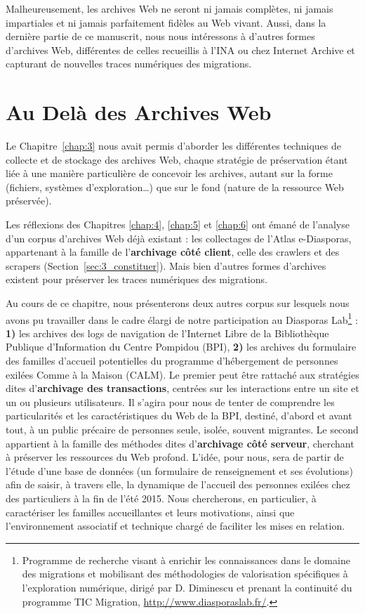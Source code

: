 \documentclass[symmetric,justified,marginals=raggedouter]{tufte-book}
\begin{document}
Malheureusement, les archives Web ne seront ni jamais complètes, ni jamais impartiales et ni jamais parfaitement fidèles au Web vivant. Aussi, dans la dernière partie de ce manuscrit, nous nous intéressons à d'autres formes d'archives Web, différentes de celles recueillis à l'INA ou chez Internet Archive et capturant de nouvelles traces numériques des migrations.



\chapter{Au Delà des Archives Web}
\label{chap:7}

\noindent Le Chapitre~\ref{chap:3} nous avait permis d'aborder les différentes techniques de collecte et de stockage des archives Web, chaque stratégie de préservation étant liée à une manière particulière de concevoir les archives, autant sur la forme (fichiers, systèmes d'exploration\ldots{}) que sur le fond (nature de la ressource Web préservée).

Les réflexions des Chapitres \ref{chap:4}, \ref{chap:5} et \ref{chap:6} ont émané de l'analyse d'un corpus d'archives Web déjà existant : les collectages de l'Atlas e-Diasporas, appartenant à la famille de l'\textbf{archivage côté client}, celle des crawlers et des scrapers (Section~\ref{sec:3_constituer}). Mais bien d'autres formes d'archives existent pour préserver les traces numériques des migrations. 

Au cours de ce chapitre, nous présenterons deux autres corpus sur lesquels nous avons pu travailler dans le cadre élargi de notre participation au Diasporas Lab\footnote{\RaggedOuter Programme de recherche visant à enrichir les connaissances dans le domaine des migrations et mobilisant des méthodologies de valorisation spécifiques à l'exploration numérique, dirigé par D. Diminescu et prenant la continuité du programme TIC Migration, \url{http://www.diasporaslab.fr/}.} : \textbf{1)} les archives des logs de navigation de l'Internet Libre de la Bibliothèque Publique d'Information du Centre Pompidou (BPI), \textbf{2)} les archives du formulaire des familles d'accueil potentielles du programme d'héber\-gement de personnes exilées Comme à la Maison (CALM). Le premier peut être rattaché aux stratégies dites d'\textbf{archivage des transactions}, centrées sur les interactions entre un site et un ou plusieurs utilisateurs. Il s'agira pour nous de tenter de comprendre les particularités et les caractéristiques du Web de la BPI, destiné, d'abord et avant tout, à un public précaire de personnes seule, isolée, souvent migrantes. Le second appartient à la famille des méthodes dites d'\textbf{archivage côté serveur}, cherchant à préserver les ressources du Web profond. L'idée, pour nous, sera de partir de l'étude d'une base de données (un formulaire de renseignement et ses évolutions) afin de saisir, à travers elle, la dynamique de l'accueil des personnes exilées chez des particuliers à la fin de l'été 2015. Nous chercherons, en particulier, à caractériser les familles accueillantes et leurs motivations, ainsi que l'environnement associatif et technique chargé de faciliter les mises en relation.  
\end{document}
